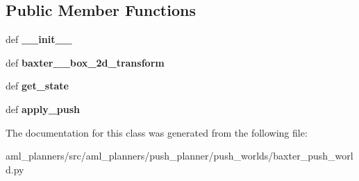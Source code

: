 \subsection*{Public Member Functions}
\begin{DoxyCompactItemize}
\item 
\hypertarget{classaml__planners_1_1push__planner_1_1push__worlds_1_1baxter__push__world_1_1_baxter_push_world_a99bfa67bc30d49f2acaa79c336d3b1f8}{def {\bfseries \-\_\-\-\_\-init\-\_\-\-\_\-}}\label{classaml__planners_1_1push__planner_1_1push__worlds_1_1baxter__push__world_1_1_baxter_push_world_a99bfa67bc30d49f2acaa79c336d3b1f8}

\item 
\hypertarget{classaml__planners_1_1push__planner_1_1push__worlds_1_1baxter__push__world_1_1_baxter_push_world_a12d4b54857aaa7f5d2f82c7832e7ebac}{def {\bfseries baxter\-\_\-\_\-box\-\_\-2d\-\_\-transform}}\label{classaml__planners_1_1push__planner_1_1push__worlds_1_1baxter__push__world_1_1_baxter_push_world_a12d4b54857aaa7f5d2f82c7832e7ebac}

\item 
\hypertarget{classaml__planners_1_1push__planner_1_1push__worlds_1_1baxter__push__world_1_1_baxter_push_world_a6ae536fd0f50143c6ea4c72dd73df307}{def {\bfseries get\-\_\-state}}\label{classaml__planners_1_1push__planner_1_1push__worlds_1_1baxter__push__world_1_1_baxter_push_world_a6ae536fd0f50143c6ea4c72dd73df307}

\item 
\hypertarget{classaml__planners_1_1push__planner_1_1push__worlds_1_1baxter__push__world_1_1_baxter_push_world_acbe82fd9c3cd8616c02ac35b783c0872}{def {\bfseries apply\-\_\-push}}\label{classaml__planners_1_1push__planner_1_1push__worlds_1_1baxter__push__world_1_1_baxter_push_world_acbe82fd9c3cd8616c02ac35b783c0872}

\end{DoxyCompactItemize}


The documentation for this class was generated from the following file\-:\begin{DoxyCompactItemize}
\item 
aml\-\_\-planners/src/aml\-\_\-planners/push\-\_\-planner/push\-\_\-worlds/baxter\-\_\-push\-\_\-world.\-py\end{DoxyCompactItemize}
